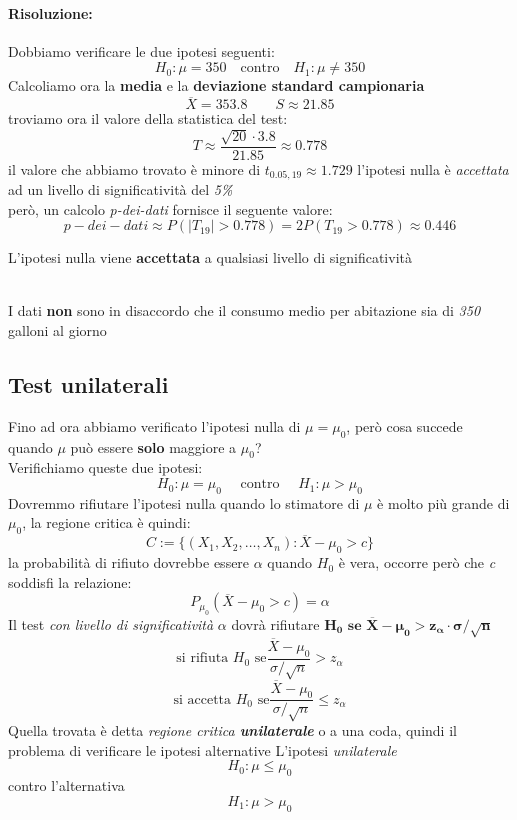 \documentclass[]{article}
\begin{document}
    \paragraph{Risoluzione:}
    Dobbiamo verificare le due ipotesi seguenti:
    \[ H_0 : \mu = 350 \quad \text{contro} \quad H_1 : \mu \not = 350 \]
    Calcoliamo ora la \textbf{media} e la \textbf{deviazione standard campionaria}
    \[ \overline{X} = 353.8 \qquad S \approx 21.85 \]
    troviamo ora il valore della statistica del test:
    \[ T \approx \frac{\sqrt{20} \cdot 3.8}{21.85} \approx \boldsymbol{0.778} \]
    il valore che abbiamo trovato è minore di $t_{0.05, 19} \approx 1.729$ l'ipotesi nulla è \textit{accettata} ad un livello di significatività del \textit{5\%} \\
    però, un calcolo \textit{p-dei-dati} fornisce il seguente valore:
    \[ p-dei-dati \approx P(|T_{19}| > 0.778) = 2 P(T_{19} > 0.778) \approx 0.446 \]
    \centerline{L'ipotesi nulla viene \textbf{accettata} a qualsiasi livello di significatività} \\[3ex]
    I dati \textbf{non} sono in disaccordo che il consumo medio per abitazione sia di \textit{350} galloni al giorno
    \subsection{Test unilaterali}
    Fino ad ora abbiamo verificato l'ipotesi nulla di $\mu = \mu_0$, però cosa succede quando $\mu$ può essere \textbf{solo} maggiore a $\mu_0$? \\
    Verifichiamo queste due ipotesi:
    \[ H_0 : \mu = \mu_0 \quad \text{ contro } \quad H_1 : \mu > \mu_0 \]
    Dovremmo rifiutare l'ipotesi nulla quando lo stimatore di $\mu$ è molto più grande di $\mu_0$, la regione critica è quindi:
    \[ C := \{ (X_1, X_2, \ldots, X_n) : \overline{X} - \mu_0 > c \} \]
    la probabilità di rifiuto dovrebbe essere $\alpha$ quando $H_0$ è vera, occorre però che \textit{c} soddisfi la relazione:
    \[ P_{\mu_0} (\overline{X} - \mu_0 > c) = \alpha \]
    Il test \textit{con livello di significatività} $\alpha$ dovrà rifiutare $\boldsymbol{H_0 \text{ se } \overline{X} - \mu_0 > z_\alpha \cdot \sigma / \sqrt{n}}$
    \[ \text{si rifiuta } H_0 \text{ se} \frac{\overline{X} - \mu_0}{\sigma / \sqrt{n}} > z_\alpha \]
    \[ \text{si accetta } H_0 \text{ se} \frac{\overline{X} - \mu_0}{\sigma / \sqrt{n}} \leq z_\alpha \]
    Quella trovata è detta \textit{regione critica \textbf{unilaterale}} o a una coda, quindi il problema di verificare le ipotesi alternative
    L'ipotesi \textit{unilaterale}
    \[ H_0 : \mu \leq \mu_0 \]
    contro l'alternativa
    \[ H_1 : \mu > \mu_0 \]
\end{document}
